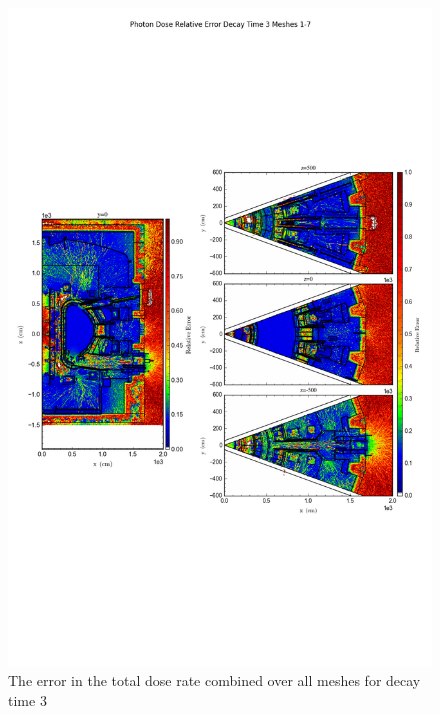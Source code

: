 \documentclass[12pt]{article}
\begin{document}
\begin{figure}[ht!]
\centering
\includegraphics[trim={0cm 9cm 0cm 10cm},clip,scale=0.75]{../plots/final_model/Photon_Dose_Relative_Error_Decay_Time_3_Meshes_1-7.png}
\caption{The error in the total dose rate combined over all meshes for decay time 3}
\label{fig:photons_dc3_no4bc_total_error}
\end{figure}
\end{document}
